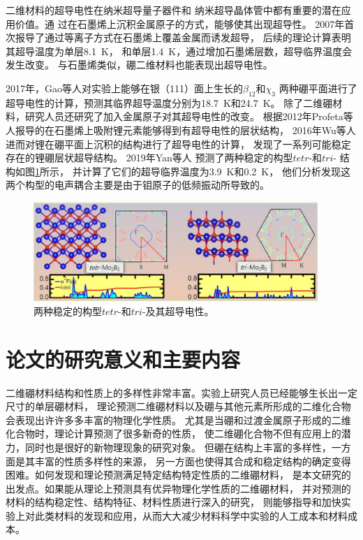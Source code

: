 二维材料的超导电性在纳米超导量子器件\cite{pribiag2015edge}和
纳米超导晶体管\cite{el2013superconductivity}中都有重要的潜在应用价值。通
过在石墨烯上沉积金属原子的方式，能够使其出现超导性。
2007年首次报导了通过等离子方式在石墨烯上覆盖金属而诱发超导\cite{uchoa2007superconducting}，
后续的理论计算表明其超导温度为单层\SI{8.1}{\kelvin}\cite{gholami2018superconducting}，
和单层\SI{1.4}{\kelvin}\cite{yang2014superconducting}，通过增加石墨烯层数，超导临界温度会发生改变。
与石墨烯类似，硼二维材料也能表现出超导电性。

2017年，Gao等人\cite{gao2017prediction}对实验上能够在银（111）面上生长的$\beta_{12}$和$\chi_3$
两种硼平面进行了超导电性的计算，预测其临界超导温度分别为\SI{18.7}{\kelvin}和\SI{24.7}{\kelvin}。
除了二维硼材料，研究人员还研究了加入金属原子对其超导电性的改变。
根据2012年Profeta等人\cite{profeta2012phonon}报导的在石墨烯上吸附锂元素能够得到有超导电性的层状结构，
2016年Wu等人\cite{wu2016lithium}进而对锂在硼平面上沉积的结构进行了超导电性的计算，
发现了一系列可能稳定存在的锂硼层状超导结构。
2019年Yan等人\cite{yan2019prediction}
预测了两种稳定的构型$tetr$-和$tri$-
结构如图\ref{fig:ch1_mo2b2_sc}所示，
并计算了它们的超导临界温度为\SI{3.9}{\kelvin}和\SI{0.2}{\kelvin}，
他们分析发现这两个构型的电声耦合主要是由于钼原子的低频振动所导致的。

\begin{figure}[bt]
  \includegraphics[width=0.96\textwidth]{figs/ch1_mo2b2_sc.png}
  \centering
  \caption{两种稳定的构型$tetr$-和$tri$-及其超导电性。}
  \label{fig:ch1_mo2b2_sc}
\end{figure}

\section{论文的研究意义和主要内容}
二维硼材料结构和性质上的多样性非常丰富。实验上研究人员已经能够生长出一定尺寸的单层硼材料，
理论预测二维硼材料以及硼与其他元素所形成的二维化合物会表现出许许多多丰富的物理化学性质。
尤其是当硼和过渡金属原子形成的二维化合物时，理论计算预测了很多新奇的性质，
使二维硼化合物不但有应用上的潜力，同时也是很好的新物理现象的研究对象。
但硼在结构上丰富的多样性，一方面是其丰富的性质多样性的来源，
另一方面也使得其合成和稳定结构的确定变得困难。如何发现和理论预测满足特定结构特定性质的二维硼材料，
是本文研究的出发点。如果能从理论上预测具有优异物理化学性质的二维硼材料，
并对预测的材料的结构稳定性、结构特征、材料性质进行深入的研究，
则能够指导和加快实验上对此类材料的发现和应用，从而大大减少材料科学中实验的人工成本和材料成本。

